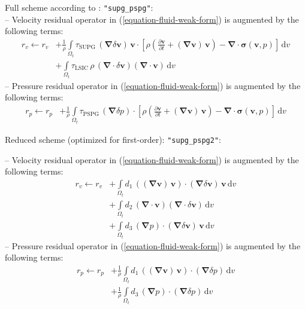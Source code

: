 \documentclass[a4paper,12pt]{report}
\newcommand{\bs}[1]{\boldsymbol{#1}}
\newcommand{\Om}{\mathit{\Omega}}
\begin{document}
Full scheme according to \cite{tezduyar2000}: \verb."supg_pspg".:\\
-- Velocity residual operator in (\ref{equation-fluid-weak-form}) is augmented by the following terms:
\begin{equation}
\begin{aligned}
r_v \leftarrow r_v &+ \frac{1}{\rho}\int\limits_{\Om_t} \tau_{\mathrm{SUPG}}\,(\bs{\nabla}\delta\bs{v})\,\bs{v} \cdot \left[\rho\left(\frac{\partial \bs{v}}{\partial t} + (\bs{\nabla}\bs{v})\,\bs{v}\right) - \bs{\nabla} \cdot \bs{\sigma}(\bs{v},p)\right]\,\mathrm{d}v \\
& + \int\limits_{\Om_t} \tau_{\mathrm{LSIC}}\,\rho\,(\bs{\nabla}\cdot\delta\bs{v})(\bs{\nabla}\cdot\bs{v})\,\mathrm{d}v
\end{aligned}
\end{equation}
-- Pressure residual operator in (\ref{equation-fluid-weak-form}) is augmented by the following terms:
\begin{equation}
\begin{aligned}
r_p \leftarrow r_p &+ \frac{1}{\rho}\int\limits_{\Om_t} \tau_{\mathrm{PSPG}}\,(\bs{\nabla}\delta p) \cdot \left[\rho\left(\frac{\partial \bs{v}}{\partial t} + (\bs{\nabla}\bs{v})\,\bs{v}\right) - \bs{\nabla} \cdot \bs{\sigma}(\bs{v},p)\right]\,\mathrm{d}v 
\end{aligned}
\end{equation}


Reduced scheme (optimized for first-order): \verb."supg_pspg2".:

-- Velocity residual operator in (\ref{equation-fluid-weak-form}) is augmented by the following terms:
\begin{equation}
\begin{aligned}
r_v \leftarrow r_v &+ \int\limits_{\Om_t} d_1\,((\bs{\nabla}\bs{v})\,\bs{v}) \cdot (\bs{\nabla}\delta\bs{v})\,\bs{v}\,\mathrm{d}v \\
& + \int\limits_{\Om_t} d_2\,(\bs{\nabla}\cdot\bs{v}) (\bs{\nabla}\cdot\delta\bs{v})\,\mathrm{d}v\\
&+ \int\limits_{\Om_t} d_3\,(\bs{\nabla}p) \cdot (\bs{\nabla}\delta\bs{v})\,\bs{v}\,\mathrm{d}v 
\end{aligned}
\end{equation}
-- Pressure residual operator in (\ref{equation-fluid-weak-form}) is augmented by the following terms:
\begin{equation}
\begin{aligned}
r_p \leftarrow r_p &+ \frac{1}{\rho}\int\limits_{\Om_t} d_1\,((\bs{\nabla}\bs{v})\,\bs{v}) \cdot (\bs{\nabla}\delta p)\,\mathrm{d}v \\
&+ \frac{1}{\rho}\int\limits_{\Om_t} d_3\,(\bs{\nabla}p) \cdot (\bs{\nabla}\delta p)\,\mathrm{d}v 
\end{aligned}
\end{equation}
\end{document}
